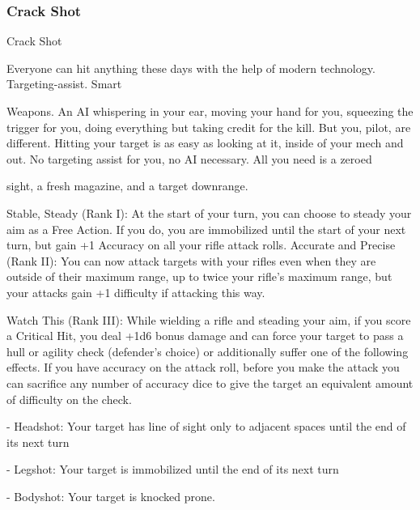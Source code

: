 \subsubsection{Crack Shot}

                                                   Crack Shot

Everyone can hit anything these days with the help of modern technology. Targeting-assist. Smart

Weapons. An AI whispering in your ear, moving your hand for you, squeezing the trigger for you, doing
everything but taking credit for the kill. But you, pilot, are different. Hitting your target is as easy as looking
at it, inside of your mech and out. No targeting assist for you, no AI necessary. All you need is a zeroed

sight, a fresh magazine, and a target downrange.

Stable, Steady (Rank I): At the start of your turn, you can choose to steady your aim as a Free
Action. If you do, you are immobilized until the start of your next turn, but gain +1 Accuracy on all
your rifle attack rolls.
Accurate and Precise (Rank II): You can now attack targets with your rifles even when they are
outside of their maximum range, up to twice your rifle’s maximum range, but your attacks gain
+1 difficulty if attacking this way.

Watch This (Rank III): While wielding a rifle and steading your aim, if you score a Critical Hit, you
deal +1d6 bonus damage and can force your target to pass a hull or agility check (defender’s
choice) or additionally suffer one of the following effects. If you have accuracy on the attack roll,
before you make the attack you can sacrifice any number of accuracy dice to give the target an
equivalent amount of difficulty on the check.

     -   Headshot: Your target has line of sight only to adjacent spaces until the end of its next
         turn

     -   Legshot: Your target is immobilized until the end of its next turn

     -   Bodyshot: Your target is knocked prone.

